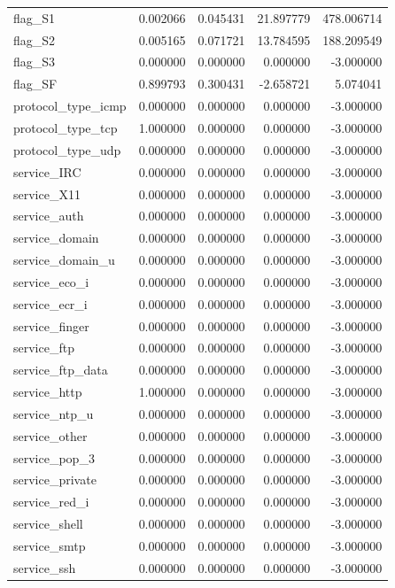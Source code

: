 \documentclass[12pt,a4paper]{article}
\begin{document}
\begin{longtable}{lrrrr}
  flag_S1 & 0.002066 & 0.045431 & 21.897779 & 478.006714 \\
  flag_S2 & 0.005165 & 0.071721 & 13.784595 & 188.209549 \\
  flag_S3 & 0.000000 & 0.000000 & 0.000000 & -3.000000 \\
  flag_SF & 0.899793 & 0.300431 & -2.658721 & 5.074041 \\
  protocol_type_icmp & 0.000000 & 0.000000 & 0.000000 & -3.000000 \\
  protocol_type_tcp & 1.000000 & 0.000000 & 0.000000 & -3.000000 \\
  protocol_type_udp & 0.000000 & 0.000000 & 0.000000 & -3.000000 \\
  service_IRC & 0.000000 & 0.000000 & 0.000000 & -3.000000 \\
  service_X11 & 0.000000 & 0.000000 & 0.000000 & -3.000000 \\
  service_auth & 0.000000 & 0.000000 & 0.000000 & -3.000000 \\
  service_domain & 0.000000 & 0.000000 & 0.000000 & -3.000000 \\
  service_domain_u & 0.000000 & 0.000000 & 0.000000 & -3.000000 \\
  service_eco_i & 0.000000 & 0.000000 & 0.000000 & -3.000000 \\
  service_ecr_i & 0.000000 & 0.000000 & 0.000000 & -3.000000 \\
  service_finger & 0.000000 & 0.000000 & 0.000000 & -3.000000 \\
  service_ftp & 0.000000 & 0.000000 & 0.000000 & -3.000000 \\
  service_ftp_data & 0.000000 & 0.000000 & 0.000000 & -3.000000 \\
  service_http & 1.000000 & 0.000000 & 0.000000 & -3.000000 \\
  service_ntp_u & 0.000000 & 0.000000 & 0.000000 & -3.000000 \\
  service_other & 0.000000 & 0.000000 & 0.000000 & -3.000000 \\
  service_pop_3 & 0.000000 & 0.000000 & 0.000000 & -3.000000 \\
  service_private & 0.000000 & 0.000000 & 0.000000 & -3.000000 \\
  service_red_i & 0.000000 & 0.000000 & 0.000000 & -3.000000 \\
  service_shell & 0.000000 & 0.000000 & 0.000000 & -3.000000 \\
  service_smtp & 0.000000 & 0.000000 & 0.000000 & -3.000000 \\
  service_ssh & 0.000000 & 0.000000 & 0.000000 & -3.000000 \\

\end{longtable}
\end{document}
